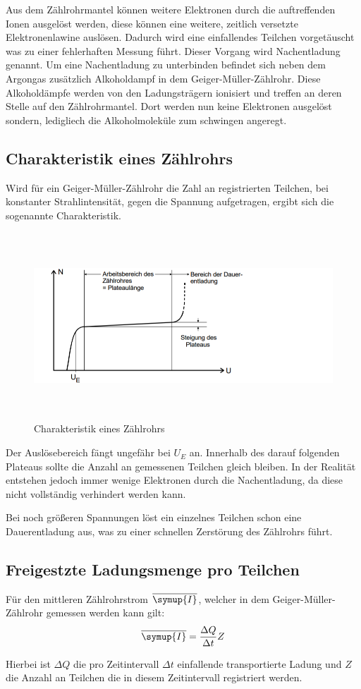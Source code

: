 Aus dem Zählrohrmantel können weitere Elektronen durch die auftreffenden Ionen ausgelöst werden, diese können eine weitere,
zeitlich versetzte Elektronenlawine auslösen. Dadurch wird eine einfallendes Teilchen vorgetäuscht was zu einer
fehlerhaften Messung führt. Dieser Vorgang wird Nachentladung genannt. Um eine Nachentladung zu unterbinden befindet
sich neben dem Argongas zusätzlich Alkoholdampf in dem Geiger-Müller-Zählrohr. Diese Alkoholdämpfe
werden von den Ladungsträgern ionisiert und treffen an deren Stelle auf den Zählrohrmantel. Dort werden nun keine
Elektronen ausgelöst sondern, ledigliech die Alkoholmoleküle zum schwingen angeregt.

\subsection{Charakteristik eines Zählrohrs}

Wird für ein  Geiger-Müller-Zählrohr die Zahl an registrierten Teilchen, bei konstanter Strahlintensität, gegen die Spannung
aufgetragen, ergibt sich die sogenannte Charakteristik.

\begin{figure}[H]
  \centering
  \includegraphics[height=7cm]{charakteristik.PNG}
  \caption{Charakteristik eines Zählrohrs \cite{sample}}
  \label{fig:Linienspektrum}
\end{figure}

Der Auslösebereich fängt ungefähr bei $U_E$ an. Innerhalb des darauf folgenden Plateaus sollte die
Anzahl an gemessenen Teilchen gleich bleiben. In der Realität entstehen jedoch immer wenige Elektronen durch die Nachentladung,
da diese nicht vollständig verhindert werden kann.

Bei noch größeren Spannungen löst ein einzelnes Teilchen schon eine Dauerentladung aus, was zu einer schnellen Zerstörung
des Zählrohrs führt.


\subsection{Freigestzte Ladungsmenge pro Teilchen}

Für den mittleren Zählrohrstrom $\overline{\symup{I}}$, welcher in dem Geiger-Müller-Zählrohr gemessen werden kann gilt:
\begin{align}
  \overline{\symup{I}} = \frac{\Delta Q}{\Delta t} Z
\end{align}

Hierbei ist $\Delta Q$ die pro Zeitintervall $\Delta t$ einfallende transportierte Ladung und $Z$ die Anzahl an Teilchen die in diesem
Zeitintervall registriert werden.
